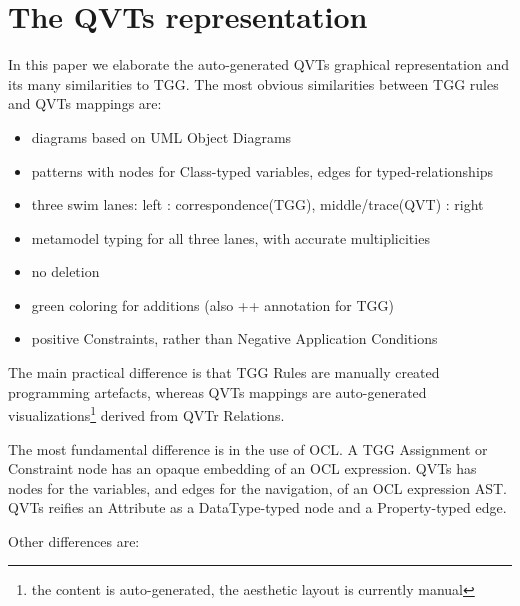 \documentclass{llncs}
\begin{document}


\section{The QVTs representation}\label{QVTs representation}

In this paper we elaborate the auto-generated QVTs graphical representation and its many similarities to TGG. The most obvious similarities between TGG rules and QVTs mappings are:

\begin{itemize}
\item diagrams based on UML Object Diagrams 
\item patterns with nodes for Class-typed variables, edges for typed-relationships
\item three swim lanes: left : correspondence(TGG), middle/trace(QVT) : right
\item metamodel typing for all three lanes, with accurate multiplicities
\item no deletion
\item green coloring for additions (also ++ annotation for TGG)
\item positive Constraints, rather than Negative Application Conditions
\end{itemize}

The main practical difference is that TGG Rules are manually created programming artefacts, whereas QVTs mappings are auto-generated visualizations\footnote{the content is auto-generated, the aesthetic layout is currently manual} derived from QVTr Relations. 

The most fundamental difference is in the use of OCL. A TGG Assignment or Constraint node has an opaque embedding of an OCL expression. QVTs has nodes for the variables, and edges for the navigation, of an OCL expression AST. QVTs reifies an Attribute as a DataType-typed node and a Property-typed edge.

Other differences are:
\end{document}

